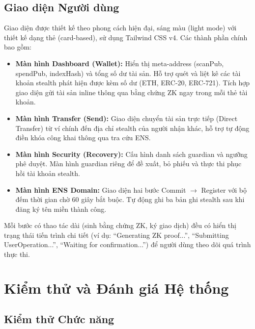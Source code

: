 \documentclass[../DoAn.tex]{subfiles}
\begin{document}
\subsection{Giao diện Người dùng}
\label{subsec:ui}

Giao diện được thiết kế theo phong cách hiện đại, sáng màu (light mode) với thiết kế dạng thẻ (card-based), sử dụng Tailwind CSS v4. Các thành phần chính bao gồm:

\begin{itemize}
    \item \textbf{Màn hình Dashboard (Wallet):} Hiển thị meta-address (scanPub, spendPub, indexHash) và tổng số dư tài sản. Hỗ trợ quét và liệt kê các tài khoản stealth phát hiện được kèm số dư (ETH, ERC-20, ERC-721). Tích hợp giao diện gửi tài sản inline thông qua bằng chứng ZK ngay trong mỗi thẻ tài khoản.

    \item \textbf{Màn hình Transfer (Send):} Giao diện chuyển tài sản trực tiếp (Direct Transfer) từ ví chính đến địa chỉ stealth của người nhận khác, hỗ trợ tự động điền khóa công khai thông qua tra cứu ENS.

    \item \textbf{Màn hình Security (Recovery):} Cấu hình danh sách guardian và ngưỡng phê duyệt. Màn hình guardian riêng để đề xuất, bỏ phiếu và thực thi phục hồi tài khoản stealth.

    \item \textbf{Màn hình ENS Domain:} Giao diện hai bước Commit $\to$ Register với bộ đếm thời gian chờ 60 giây bắt buộc. Tự động ghi ba bản ghi stealth sau khi đăng ký tên miền thành công.
\end{itemize}

Mỗi bước có thao tác dài (sinh bằng chứng ZK, ký giao dịch) đều có hiển thị trạng thái tiến trình chi tiết (ví dụ: ``Generating ZK proof...'', ``Submitting UserOperation...'', ``Waiting for confirmation...'') để người dùng theo dõi quá trình thực thi.

\section{Kiểm thử và Đánh giá Hệ thống}
\label{sec:testing}

\subsection{Kiểm thử Chức năng}
\label{subsec:functional_testing}
\end{document}
